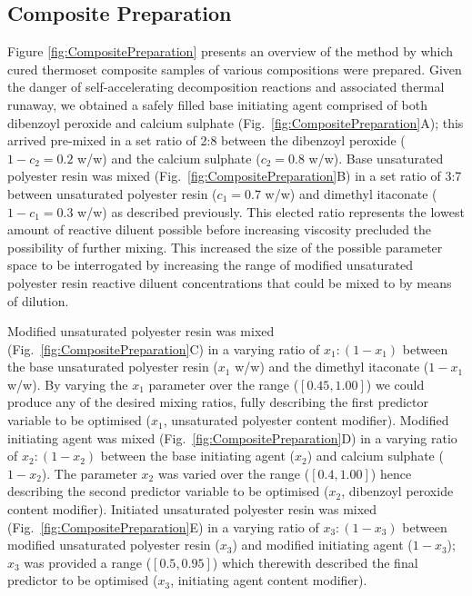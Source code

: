 \subsection{Composite Preparation}
Figure \ref{fig:CompositePreparation} presents an overview of the method by
 which cured thermoset composite samples of various compositions were
 prepared.
Given the danger of self-accelerating decomposition reactions and 
 associated thermal runaway, we obtained a safely filled base initiating
 agent comprised of both dibenzoyl peroxide and calcium sulphate
 (Fig.~\ref{fig:CompositePreparation}A); this arrived pre-mixed in a set 
 ratio of 2:8 between the dibenzoyl peroxide (\(1-c_{2}=0.2\) w/w) and the
 calcium sulphate (\(c_{2}=0.8\) w/w).
Base unsaturated polyester resin was mixed
 (Fig.~\ref{fig:CompositePreparation}B) in a set ratio of 3:7 between
 unsaturated polyester resin (\(c_{1}=0.7\) w/w) and dimethyl
 itaconate (\(1-c_{1}=0.3\) w/w) as described previously.
This elected ratio represents the lowest amount of reactive diluent 
 possible before increasing viscosity precluded the possibility of 
 further mixing.
This increased the size of the possible parameter space 
 to be interrogated by increasing the range of modified unsaturated 
 polyester resin reactive diluent concentrations that could be mixed 
 to by means of dilution.

Modified unsaturated polyester resin was mixed
 (Fig.~\ref{fig:CompositePreparation}C) in a varying ratio of
 \(x_{1}:(1-x_{1})\) between the base unsaturated polyester resin
 (\(x_{1}\) w/w) and the dimethyl itaconate (\(1-x_{1}\) w/w).
By varying the \(x_{1}\) parameter over the range (\([0.45,1.00]\)) we
 could produce any of the desired mixing ratios, fully describing
 the first predictor variable to be optimised (\(x_{1}\), 
 unsaturated polyester content modifier).
Modified initiating agent was mixed (Fig.~\ref{fig:CompositePreparation}D)
 in a varying ratio of \(x_{2}:(1-x_{2})\) between the base initiating agent
 (\(x_{2}\)) and calcium sulphate (\(1-x_{2}\)).
The parameter \(x_{2}\) was varied over the range (\([0.4,1.00]\)) hence 
 describing the second predictor variable to be optimised 
 (\(x_{2}\), dibenzoyl peroxide content modifier).
Initiated unsaturated polyester resin was mixed
 (Fig.~\ref{fig:CompositePreparation}E) in a varying ratio of
 \(x_{3}:(1-x_{3})\) between modified unsaturated polyester resin
 (\(x_{3}\)) and modified initiating agent (\(1-x_{3}\)); \(x_{3}\) was 
 provided a range (\([0.5,0.95]\)) which therewith described the final
 predictor to be optimised (\(x_{3}\), initiating agent content modifier).

